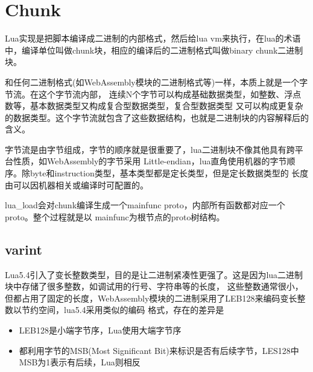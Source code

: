 \chapter{Chunk}

Lua实现是把脚本编译成二进制的内部格式，然后给lua vm来执行，在lua的术语中，编译单位叫做chunk块，相应的编译后的二进制格式叫做binary chunk二进制块。

和任何二进制格式(如WebAssembly模块的二进制格式等)一样，本质上就是一个字节流。在这个字节流内部，
连续N个字节可以构成基础数据类型，如整数、浮点数等，基本数据类型又构成复合型数据类型，复合型数据类型
又可以构成更复杂的数据类型。这个字节流就包含了这些数据结构，也就是二进制块的内容解释后的含义。

字节流是由字节组成，字节的顺序就是很重要了，lua二进制块不像其他具有跨平台性质，如WebAssembly的字节采用
Little-endian，lua直角使用机器的字节顺序。除byte和instruction类型，基本类型都是定长类型，但是定长数据类型的
长度由可以因机器相关或编译时可配置的。

lua\_load会对chunk编译生成一个mainfunc proto，内部所有函数都对应一个proto。整个过程就是以
mainfunc为根节点的proto树结构。


\section{varint}
Lua5.4引入了变长整数类型，目的是让二进制紧凑性更强了。这是因为lua二进制块中存储了很多整数，如调试用的行号、字符串等的长度，
这些整数通常很小，但都占用了固定的长度，WebAssembly模块的二进制采用了LEB128来编码变长整数以节约空间，lua5.4采用类似的编码
格式，存在的差异是
\begin{itemize}
    \item {LEB128是小端字节序，Lua使用大端字节序}
    \item {都利用字节的MSB(Most Significant Bit)来标识是否有后续字节，LES128中MSB为1表示有后续，Lua则相反}
\end{itemize}

